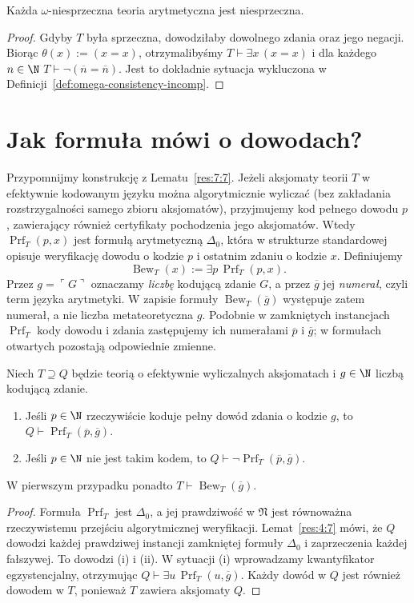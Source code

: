 \begin{lemat}
Każda $\omega$-niesprzeczna teoria arytmetyczna jest niesprzeczna.
\end{lemat}
\begin{proof}
Gdyby $T$ była sprzeczna, dowodziłaby dowolnego zdania
oraz jego negacji. Biorąc $\theta(x):=(x=x)$, otrzymalibyśmy
$T\vdash\exists x\,(x=x)$ i dla każdego $n\in\N$
$T\vdash\neg(\overline n=\overline n)$. Jest to dokładnie
sytuacja wykluczona w Definicji~\ref{def:omega-consistency-incomp}.
\end{proof}

\section{Jak formuła mówi o dowodach?}
Przypomnijmy konstrukcję z Lematu~\ref{res:7:7}.
Jeżeli aksjomaty teorii $T$ w efektywnie kodowanym języku
można algorytmicznie wyliczać (bez zakładania rozstrzygalności
samego zbioru aksjomatów), przyjmujemy kod pełnego dowodu $p$,
zawierający również certyfikaty pochodzenia jego aksjomatów. Wtedy
$\operatorname{Prf}_T(p,x)$ jest formułą arytmetyczną
$\Delta_0$, która w strukturze standardowej opisuje
weryfikację dowodu o kodzie $p$ i ostatnim zdaniu o kodzie $x$.
Definiujemy
\[
\operatorname{Bew}_T(x):=\exists p\,\operatorname{Prf}_T(p,x).
\]
Przez $g=\ulcorner G\urcorner$ oznaczamy \emph{liczbę}
kodującą zdanie $G$, a przez $\overline g$ jej \emph{numerał},
czyli term języka arytmetyki. W zapisie formuły $\operatorname{Bew}_T(\overline g)$
występuje zatem numerał, a nie liczba metateoretyczna $g$.
Podobnie w zamkniętych instancjach $\operatorname{Prf}_T$
kody dowodu i zdania zastępujemy ich numerałami
$\overline p$ i $\overline g$; w formułach otwartych
pozostają odpowiednie zmienne.

\begin{lemat}\label{lem:incomp-proof-check}
Niech $T\supseteq Q$ będzie teorią o efektywnie wyliczalnych
aksjomatach i $g\in\N$ liczbą kodującą zdanie.
\begin{enumerate}[label=(\roman*)]
\item Jeśli $p\in\N$ rzeczywiście koduje pełny dowód zdania
o kodzie $g$, to $Q\vdash\operatorname{Prf}_T(\overline p,\overline g)$.
\item Jeśli $p\in\N$ nie jest takim kodem, to
$Q\vdash\neg\operatorname{Prf}_T(\overline p,\overline g)$.
\end{enumerate}
W pierwszym przypadku ponadto $T\vdash\operatorname{Bew}_T(\overline g)$.
\end{lemat}
\begin{proof}
Formuła $\operatorname{Prf}_T$ jest $\Delta_0$,
a jej prawdziwość w $\mathfrak N$ jest równoważna
rzeczywistemu przejściu algorytmicznej weryfikacji.
Lemat~\ref{res:4:7} mówi, że $Q$ dowodzi każdej prawdziwej
instancji zamkniętej formuły $\Delta_0$ i zaprzeczenia
każdej fałszywej. To dowodzi (i) i (ii).
W sytuacji (i) wprowadzamy kwantyfikator egzystencjalny,
otrzymując $Q\vdash\exists u\,\operatorname{Prf}_T(u,\overline g)$.
Każdy dowód w $Q$ jest również dowodem w $T$, ponieważ
$T$ zawiera aksjomaty $Q$.
\end{proof}

